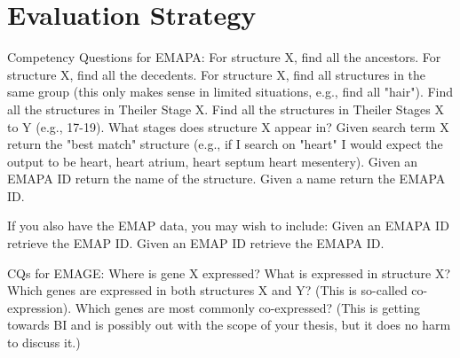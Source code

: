 \chapter{Evaluation Strategy}
Competency Questions for EMAPA:
For structure X, find all the ancestors.
For structure X, find all the decedents.
For structure X, find all structures in the same group (this only
makes sense in limited situations, e.g., find all "hair").
Find all the structures in Theiler Stage X.
Find all the structures in Theiler Stages X to Y (e.g., 17-19).
What stages does structure X appear in?
Given search term X return the "best match" structure (e.g., if I
search on "heart" I would expect the output to be heart, heart atrium,
heart septum  heart mesentery).
Given an EMAPA ID return the name of the structure.
Given a name return the EMAPA ID.

If you also have the EMAP data, you may wish to include:
Given an EMAPA ID retrieve the EMAP ID.
Given an EMAP ID retrieve the EMAPA ID.

CQs for EMAGE:
Where is gene X expressed?
What is expressed in structure X?
Which genes are expressed in both structures X and Y?  (This is
so-called co-expression).
Which genes are most commonly co-expressed? (This is getting towards
BI and is possibly out with the scope of your thesis, but it does no
harm to discuss it.)
